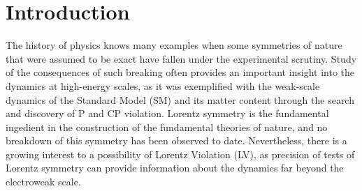\documentclass[12pt]{revtex4}
\begin{document}
\newpage

\setcounter{footnote}{0}
\setcounter{equation}{0}


\section{Introduction}
\label{Intro}


The history of physics knows many examples when 
some symmetries of nature that were assumed to be exact have fallen under
the experimental scrutiny. Study of the consequences of such breaking 
often provides an important insight into the dynamics at high-energy scales,
as it was exemplified with the weak-scale dynamics of the Standard Model (SM)
and its matter content through the search and discovery of P and CP violation. 
Lorentz symmetry is the fundamental ingedient in the construction of the 
fundamental theories of nature, and no breakdown of this symmetry has been 
observed to date. Nevertheless, there is a growing interest to 
a possibility of Lorentz Violation (LV), as precision of 
tests of Lorentz symmetry can provide information about the 
dynamics far beyond the electroweak scale. 
\end{document}
